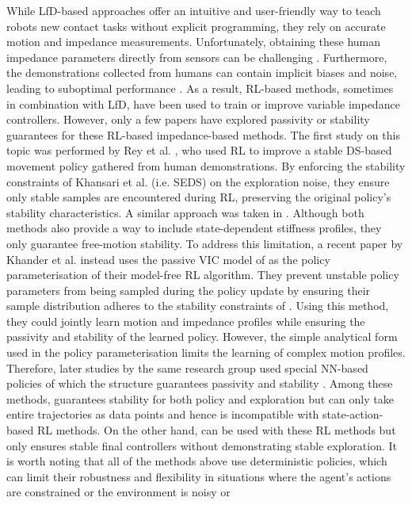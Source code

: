While LfD-based approaches offer an intuitive and user-friendly way to teach robots new contact tasks without explicit programming, they rely on accurate motion and impedance measurements. Unfortunately, obtaining these human impedance parameters directly from sensors can be challenging \cite{zhangNeuralNetworkBased2023,abu-dakkaVariableImpedanceControl2020,jinModelPredictiveVariable2023}. 
Furthermore, the demonstrations collected from humans can contain implicit biases and noise, leading to suboptimal performance \cite{kimReinforcementLearningBased2020,reyLearningMotionsDemonstrations2018,abu-dakkaVariableImpedanceControl2020,xieRobotLearningDemonstration2020}. As a result, RL-based methods, sometimes in combination with LfD, \cite{buchliLearningVariableImpedance2011,abu-dakkaVariableImpedanceControl2020,saverianoDynamicMovementPrimitives2021,elguea-aguinacoReviewReinforcementLearning2023} have been used to train or improve variable impedance controllers. However, only a few papers have explored passivity or stability guarantees for these RL-based impedance-based methods. The first study on this topic was performed by Rey et al. \cite{reyLearningMotionsDemonstrations2018}, who used RL to improve a stable DS-based movement policy gathered from human demonstrations. By enforcing the stability constraints of Khansari et al. \cite{khansari-zadehLearningStableNonlinear2011} (i.e. SEDS) on the exploration noise, they ensure only stable samples are encountered during RL, preserving the original policy's stability characteristics. A similar approach was taken in \cite{huRobotPolicyImprovement2022}. Although both methods also provide a way to include state-dependent stiffness profiles, they only guarantee free-motion stability. To address this limitation, a recent paper by Khander et al. \cite{khaderStabilityGuaranteedReinforcementLearning2020} instead uses the passive VIC model of \cite{khansari-zadehModelingRobotDiscrete2014} as the policy parameterisation of their model-free RL algorithm. They prevent unstable policy parameters from being sampled during the policy update by ensuring their sample distribution adheres to the stability constraints of \cite{khansari-zadehModelingRobotDiscrete2014}. Using this method, they could jointly learn motion and impedance profiles while ensuring the passivity and stability of the learned policy. However, the simple analytical form used in the policy parameterisation limits the learning of complex motion profiles. Therefore, later studies by the same research group used special NN-based policies of which the structure guarantees passivity and stability \cite{khaderLearningStableNormalizingFlow2021,khaderLearningDeepNeural2021}. Among these methods, \cite{khaderLearningDeepNeural2021} guarantees stability for both policy and exploration but can only take entire trajectories as data points and hence is incompatible with state-action-based RL methods. On the other hand, \cite{khaderLearningStableNormalizingFlow2021} can be used with these RL methods but only ensures stable final controllers without demonstrating stable exploration. It is worth noting that all of the methods above use deterministic policies, which can limit their robustness and flexibility in situations where the agent's actions are constrained or the environment is noisy or 